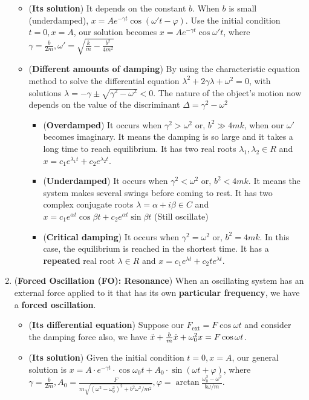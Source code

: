 \documentclass[10pt, landscape]{article}
\begin{document}
\begin{multicols}{4}
\begin{enumerate}
\begin{itemize}
        \item (\textbf{Its solution}) It depends on the constant $b$. When $b$ is small (underdamped), $x=Ae^{-\gamma t}\cos(\omega't-\varphi)$. Use the initial condition $t=0, x=A$, our solution becomes $x=Ae^{-\gamma t}\cos\omega't$, where $\gamma=\frac{b}{2m}, \omega'=\sqrt{\frac{k}{m}-\frac{b^2}{4m^2}}$
        \item (\textbf{Different amounts of damping}) By using the characteristic equation method to solve the differential equation $\lambda^2+2\gamma\lambda+\omega^2=0$, with solutions $\lambda=-\gamma\pm\sqrt{\gamma^2-\omega^2}<0$. The nature of the object's motion now depends on the value of the discriminant $\Delta=\gamma^2-\omega^2$
        \begin{itemize}
            \item (\textbf{Overdamped}) It occurs when $\gamma^2>\omega^2\text{ or, }b^2\gg 4mk$, when our $\omega'$ becomes imaginary. It means the damping is so large and it takes a long time to reach equilibrium. It has two real roots $\lambda_1, \lambda_2 \in R$ and $x=c_1e^{\lambda_1 t}+c_2e^{\lambda_2 t}$. 
            \item (\textbf{Underdamped}) It occurs when $\gamma^2<\omega^2\text{ or, }b^2 < 4mk$. It means the system makes several swings before coming to rest. It has two complex conjugate roots $\lambda=\alpha+i\beta \in C$ and $x=c_1e^{\alpha t}\cos\beta t+c_2e^{\alpha t}\sin\beta t$ (Still oscillate)
            \item (\textbf{Critical damping}) It occurs when $\gamma^2=\omega^2\text{ or, }b^2=4mk$. In this case, the equilibrium is reached in the shortest time. It has a \textbf{repeated} real root $\lambda\in R$ and $x=c_1e^{\lambda t}+c_2te^{\lambda t}$.
        \end{itemize}
    \end{itemize}
  \item (\textbf{Forced Oscillation (FO): Resonance}) When an oscillating system has an external force applied to it that has its own \textbf{particular frequency}, we have a \textbf{forced oscillation}.
    \begin{itemize}
        \item (\textbf{Its differential equation}) Suppose our $F_{\text{ext}}=F\cos\omega t$ and consider the damping force also, we have $\Ddot{x}+\frac{b}{m}\Dot{x}+\omega_0^2x=F\cos\omega t$.
        \item (\textbf{Its solution}) Given the initial condition $t=0, x=A$, our general solution is $x=A\cdot e^{-\gamma t}\cdot\cos\omega_0t+A_0\cdot\sin(\omega t+\varphi)$, where $\gamma=\frac{b}{2m}, A_0=\frac{F}{m\sqrt{(\omega^2-\omega_0^2)^2+b^2\omega^2/m^2}}, \varphi=\arctan\frac{\omega_0^2-\omega^2}{b\omega/m}$.

\end{itemize}
\end{enumerate}
\end{multicols}
\end{document}
